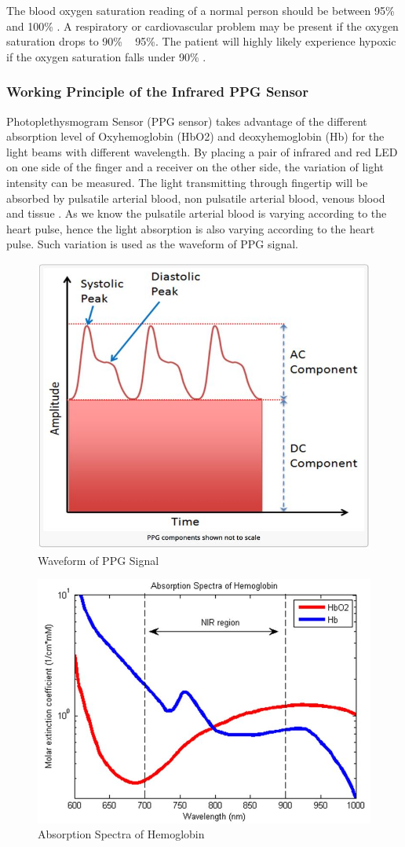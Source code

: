 The blood oxygen saturation reading of a normal person should be between 95\% and 100\% \cite{george1}. A respiratory or cardiovascular problem may be present if the oxygen saturation drops to 90\% ~ 95\%. The patient will highly likely experience hypoxic if the oxygen saturation falls under 90\% \cite{george2}.

\subsubsection{Working Principle of the Infrared PPG Sensor}

Photoplethysmogram Sensor (PPG sensor) takes advantage of the different absorption level of Oxyhemoglobin (HbO2) and deoxyhemoglobin (Hb) for the light beams with different wavelength. By placing a pair of infrared and red LED on one side of the finger and a receiver on the other side, the variation of light intensity can be measured. The light transmitting through fingertip will be absorbed by pulsatile arterial blood, non pulsatile arterial blood, venous blood and tissue \cite{george5}. As we know the pulsatile arterial blood is varying according to the heart pulse, hence the light absorption is also varying according to the heart pulse. Such variation is used as the waveform of PPG signal.

\begin{figure}[H]
	\centering
	\includegraphics[width=0.6\linewidth]{georgepic1.jpg}
	\caption{Waveform of PPG Signal \cite{george6}}
\end{figure}

\begin{figure}[H]
	\centering
	\includegraphics[width=0.6\linewidth]{georgepic2.jpg}
	\caption{Absorption Spectra of Hemoglobin \cite{george3}}
\end{figure}


